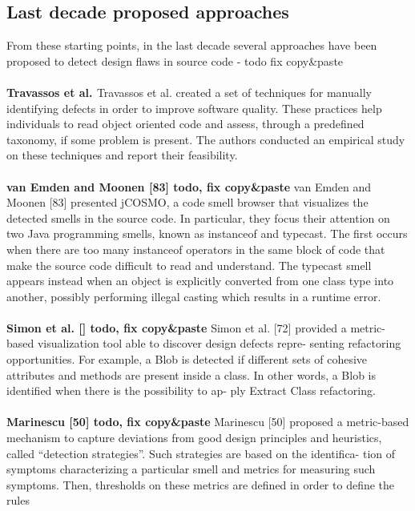 \subsection{Last decade proposed approaches}
From these starting points, in the last decade several approaches have been proposed to detect design flaws in source code - todo fix copy\&paste
\\
\\
\textbf{Travassos et al. \cite{travassos1999detecting} }
Travassos et al. created a set of techniques for manually identifying defects in order to improve software quality. These practices help individuals to read object oriented code and assess, through a predefined taxonomy, if some problem is present. The authors conducted an empirical study on these techniques and report their feasibility.
\\
\\
\textbf{van Emden and Moonen [83] todo, fix copy\&paste }
van Emden and Moonen [83] presented jCOSMO, a code smell browser that visualizes the detected smells in the source code. In particular, they focus their attention on two Java programming smells, known as instanceof and typecast. The first occurs when there are too many instanceof operators in the same block of code that make the source code difficult to read and understand. The typecast smell appears instead when an object is explicitly converted from one class type into another, possibly performing illegal casting which results in a runtime error.
\\
\\
\textbf{Simon et al. [] todo, fix copy\&paste }
Simon et al. [72] provided a metric-based visualization tool able to discover design defects repre- senting refactoring opportunities. For example, a Blob is detected if different sets of cohesive attributes and methods are present inside a class. In other words, a Blob is identified when there is the possibility to ap- ply Extract Class refactoring.
\\
\\
\textbf{Marinescu [50] todo, fix copy\&paste }
Marinescu [50] proposed a metric-based mechanism to capture deviations from good design principles and heuristics, called “detection strategies”. Such strategies are based on the identifica- tion of symptoms characterizing a particular smell and metrics for measuring such symptoms. Then, thresholds on these metrics are defined in order to define the rules
\\
\\
